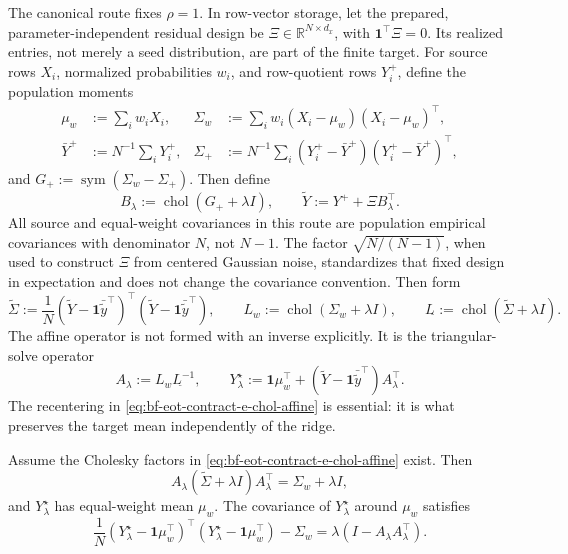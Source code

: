 The canonical route fixes \(\rho=1\).  In row-vector storage, let the prepared,
parameter-independent residual design be
\(\Xi\in\mathbb R^{N\times d_x}\), with \(\mathbf 1^\top\Xi=0\).  Its realized
entries, not merely a seed distribution, are part of the finite target.  For
source rows \(X_i\), normalized probabilities \(w_i\), and row-quotient rows
\(Y_i^+\), define the population moments
\begin{align}
  \mu_w&:=\sum_iw_iX_i,&
  \Sigma_w&:=\sum_iw_i(X_i-\mu_w)(X_i-\mu_w)^\top,\\
  \bar Y^+&:=N^{-1}\sum_iY_i^+,&
  \Sigma_+&:=N^{-1}\sum_i(Y_i^+-\bar Y^+)(Y_i^+-\bar Y^+)^\top,
\end{align}
and \(G_+:=\operatorname{sym}(\Sigma_w-\Sigma_+)\).  Then define
\begin{equation}
\label{eq:bf-eot-contract-e-chol-ridge}
  B_\lambda:=\operatorname{chol}(G_+ + \lambda I),
  \qquad
  \widetilde Y:=Y^+ + \Xi B_\lambda^\top .
\end{equation}
All source and equal-weight covariances in this route are population empirical
covariances with denominator \(N\), not \(N-1\).  The factor
\(\sqrt{N/(N-1)}\), when used to construct \(\Xi\) from centered Gaussian
noise, standardizes that fixed design in expectation and does not change the
covariance convention.
Then form
\[
  \widetilde\Sigma
  :=
  \frac1N
  (\widetilde Y-\mathbf 1\bar{\widetilde y}^\top)^\top
  (\widetilde Y-\mathbf 1\bar{\widetilde y}^\top) ,
  \qquad
  L_w:=\operatorname{chol}(\Sigma_w+\lambda I),
  \qquad
  L_{\widetilde{}}:=\operatorname{chol}(\widetilde\Sigma+\lambda I).
\]
The affine operator is not formed with an inverse explicitly.  It is the
triangular-solve operator
\begin{equation}
\label{eq:bf-eot-contract-e-chol-affine}
  A_\lambda
  :=
  L_w L_{\widetilde{}}^{-1},
  \qquad
  Y^\star_\lambda
  :=
  \mathbf 1\mu_w^\top
  +
  (\widetilde Y-\mathbf 1\bar{\widetilde y}^\top)A_\lambda^\top.
\end{equation}
The recentering in \eqref{eq:bf-eot-contract-e-chol-affine} is essential: it is
what preserves the target mean independently of the ridge.

\begin{proposition}
\label{prop:bf-eot-contract-e-chol-restoration}
Assume the Cholesky factors in
\eqref{eq:bf-eot-contract-e-chol-affine} exist.  Then
\[
  A_\lambda(\widetilde\Sigma+\lambda I)A_\lambda^\top
  =
  \Sigma_w+\lambda I,
\]
and \(Y^\star_\lambda\) has equal-weight mean \(\mu_w\).  The covariance of
\(Y^\star_\lambda\) around \(\mu_w\) satisfies
\[
  \frac1N
  (Y^\star_\lambda-\mathbf 1\mu_w^\top)^\top
  (Y^\star_\lambda-\mathbf 1\mu_w^\top)
  -
  \Sigma_w
  =
  \lambda(I-A_\lambda A_\lambda^\top).
\]
\end{proposition}

